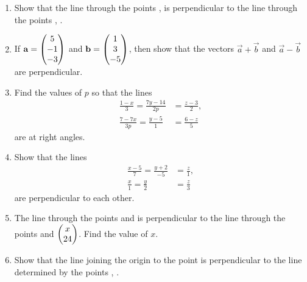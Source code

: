 \documentclass[journal,12pt,twocolumn]{IEEEtran}
\renewcommand\thesection{\arabic{section}}
\begin{document}
\begin{enumerate}[label=\thesection.\arabic*.,ref=\thesection.\theenumi]
\item Show that the line through the points ,  is perpendicular to the line through the points   , .
\\
\solution 
\item If 
$\mathbf{a}=\begin{pmatrix}5\\-1\\-3\end{pmatrix}$
  and 
$\mathbf{b}=\begin{pmatrix}1\\3\\-5\end{pmatrix}$,
%
then show that the vectors $\vec{a}+\vec{b}$ and $\vec{a}-\vec{b}$ are perpendicular.
%
\\
\solution 
\item Find the values of $p$ so that the lines 
\begin{align}
\frac{1-x}{3} = \frac{7y-14}{2p} &= \frac{z-3}{2}, 
\\
\frac{7-7x}{3p} = \frac{y-5}{1} &= \frac{6-z}{5} 
\end{align}
are at right angles.
\\
\solution
%
\item Show that the lines 
\begin{align}
\frac{x-5}{7} = \frac{y+2}{-5} &= \frac{z}{1}, 
\\
\frac{x}{1} = \frac{y}{2} &= \frac{z}{3} 
\end{align}
%
are perpendicular to each other.
\\
\solution
%
\item The line through the points  and  is perpendicular to the line through the points  and $\begin{pmatrix}x\\24\end{pmatrix}$.  Find the value of $x$.
\\
\solution
%
\item Show that the line joining the origin to the point  is perpendicular to the line determined by the points , .

\end{enumerate}
\end{document}

